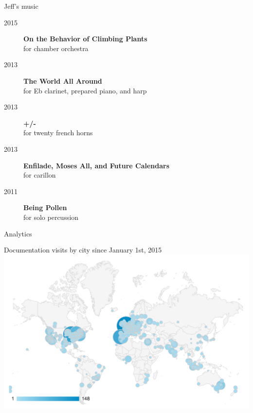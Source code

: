 \documentclass[10pt]{beamer}
\begin{document}
\begin{frame}{Jeff's music}
    \begin{description}
        \item[2015] \textbf{On the Behavior of Climbing Plants} \\ 
            for chamber orchestra
        \item[2013] \textbf{The World All Around} \\ 
            for Eb clarinet, prepared piano, and harp
        \item[2013] \textbf{+/-} \\ 
            for twenty french horns
        \item[2013] \textbf{Enfilade, Moses All, and Future Calendars} \\ 
            for carillon
        \item[2011] \textbf{Being Pollen} \\ 
            for solo percussion
    \end{description}
\end{frame}


\begin{frame}{Analytics}
    \begin{center}
        Documentation visits by city since January 1st, 2015
        \includegraphics[scale=0.4, fbox]{analytics.png}
    \end{center}
\end{frame}
\end{document}
